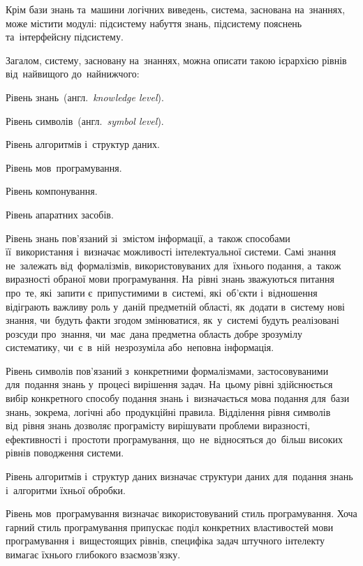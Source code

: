 \documentclass[
  a4paper,
  oneside,
  BCOR = 10mm,
  DIV = 12,
  12pt,
  headings = normal,
]{scrartcl}
\newcommand{\transeng}[1]{{англ.}~\textit{\textenglish{#1}}}
\begin{document}
      Крім бази знань та~машини логічних виведень, система, заснована на~знаннях, може містити модулі: підсистему набуття знань, підсистему пояснень та~інтерфейсну підсистему.

      Загалом, систему, засновану на~знаннях, можна описати такою ієрархією рівнів від~найвищого до~найнижчого:
      \begin{hangenumerate}
        \item Рівень знань~(\transeng{knowledge level}).
        \item Рівень символів~(\transeng{symbol level}).
        \item Рівень алгоритмів і~структур даних.
        \item Рівень мов~програмування.
        \item Рівень компонування.
        \item Рівень апаратних засобів.
      \end{hangenumerate}

      Рівень знань пов'язаний зі~змістом інформації, а~також способами її~використання і~визначає можливості інтелектуальної системи. Самі знання не~залежать від~формалізмів, використовуваних для~їхнього подання, а~також виразності обраної мови програмування. На~рівні знань зважуються питання про~те, які~запити є~припустимими в~системі, які~об'єкти і~відношення відіграють важливу роль у~даній предметній області, як~додати в~систему нові знання, чи~будуть факти згодом змінюватися, як~у~системі будуть реалізовані розсуди про~знання, чи~має~дана предметна область добре зрозумілу систематику, чи~є~в~ній~незрозуміла або~неповна інформація.

      Рівень символів пов'язаний з~конкретними формалізмами, застосовуваними для~подання знань у~процесі вирішення задач. На~цьому рівні здійснюється вибір конкретного способу подання знань і~визначається мова подання для~бази знань, зокрема, логічні або~продукційні правила. Відділення рівня символів від~рівня знань дозволяє програмісту вирішувати проблеми виразності, ефективності і~простоти програмування, що~не~відносяться до~більш високих рівнів поводження системи.

      Рівень алгоритмів і~структур даних визначає структури даних для~подання знань і~алгоритми їхньої обробки.

      Рівень мов~програмування визначає використовуваний стиль програмування. Хоча гарний стиль програмування припускає поділ конкретних властивостей мови програмування і~вищестоящих рівнів, специфіка задач штучного інтелекту вимагає їхнього глибокого взаємозв'язку.
\end{document}
